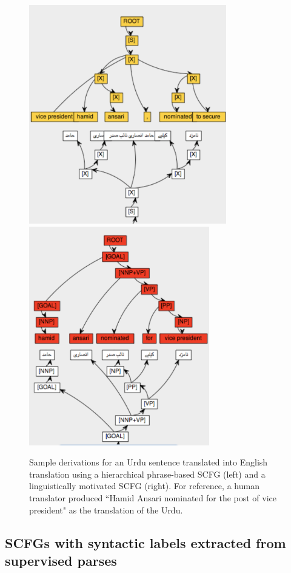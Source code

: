 \begin{figure}
\includegraphics[height=3.75in]{SCFGs/hiero-tree}
\includegraphics[height=3.75in]{SCFGs/samt-tree}
\caption{Sample derivations for an Urdu sentence translated into English translation using a hierarchical phrase-based SCFG (left) and a linguistically motivated SCFG (right).  For reference, a human translator produced ``Hamid Ansari nominated for the post of vice president" as the translation of the Urdu. }
\label{example-derivations}
\end{figure}


\subsection{SCFGs with syntactic labels extracted from supervised parses}\label{samt}

